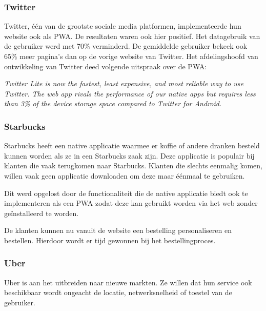 		\autocite{Developers2020}
	
	
	\subsubsection{Twitter}
	
		Twitter, één van de grootste sociale media platformen, implementeerde hun website ook als PWA. De resultaten waren ook hier positief. Het datagebruik van de gebruiker werd met 70\% verminderd. De gemiddelde gebruiker bekeek ook 65\% meer pagina’s dan op de vorige website van Twitter.
		Het afdelingshoofd van ontwikkeling van Twitter deed volgende uitspraak over de PWA:
		
		\textit{Twitter Lite is now the fastest, least expensive, and most reliable way to use Twitter. The web app rivals the performance of our native apps but requires less than 3\% of the device storage space compared to Twitter for Android.}
		
		\autocite{Developers2020a}
		\autocite{Love2018}
	
	\subsubsection{Starbucks}
	
		Starbucks heeft een native applicatie waarmee er koffie of andere dranken besteld kunnen worden als ze in een Starbucks zaak zijn. Deze applicatie is populair bij klanten die vaak terugkomen naar Starbucks. Klanten die slechts eenmalig komen, willen vaak geen applicatie downloaden om deze maar éénmaal te gebruiken.
		
		Dit werd opgelost door de functionaliteit die de native applicatie biedt ook te implementeren als een PWA zodat deze kan gebruikt worden via het web zonder geïnstalleerd te worden.
		
		De klanten kunnen nu vanuit de website een bestelling personaliseren en bestellen. Hierdoor wordt er tijd gewonnen bij het bestellingproces.
		
		\autocite{Formidable2020}
		\autocite{Kawatka2020}
	
	\subsubsection{Uber}
	
		Uber is aan het uitbreiden naar nieuwe markten. Ze willen dat hun service ook beschikbaar wordt ongeacht de locatie, netwerksnelheid of toestel van de gebruiker.
		
